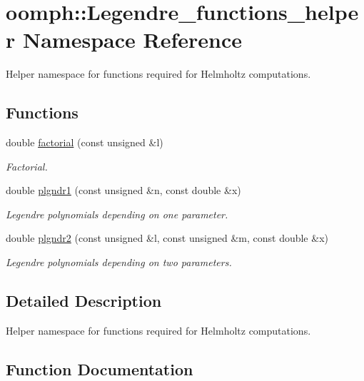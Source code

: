 \hypertarget{namespaceoomph_1_1Legendre__functions__helper}{}\section{oomph\+:\+:Legendre\+\_\+functions\+\_\+helper Namespace Reference}
\label{namespaceoomph_1_1Legendre__functions__helper}


Helper namespace for functions required for Helmholtz computations.  


\subsection*{Functions}
\begin{DoxyCompactItemize}
\item 
double \hyperlink{namespaceoomph_1_1Legendre__functions__helper_a3dd21a83f1086186315aa4f5445a8287}{factorial} (const unsigned \&l)
\begin{DoxyCompactList}\small\item\em Factorial. \end{DoxyCompactList}\item 
double \hyperlink{namespaceoomph_1_1Legendre__functions__helper_ab30701a5b66d96424a97e10e389be377}{plgndr1} (const unsigned \&n, const double \&x)
\begin{DoxyCompactList}\small\item\em Legendre polynomials depending on one parameter. \end{DoxyCompactList}\item 
double \hyperlink{namespaceoomph_1_1Legendre__functions__helper_ad67fdae863cee220b1051883aac923aa}{plgndr2} (const unsigned \&l, const unsigned \&m, const double \&x)
\begin{DoxyCompactList}\small\item\em Legendre polynomials depending on two parameters. \end{DoxyCompactList}\end{DoxyCompactItemize}


\subsection{Detailed Description}
Helper namespace for functions required for Helmholtz computations. 

\subsection{Function Documentation}
\mbox{\label{namespaceoomph_1_1Legendre__functions__helper_a3dd21a83f1086186315aa4f5445a8287}} 

